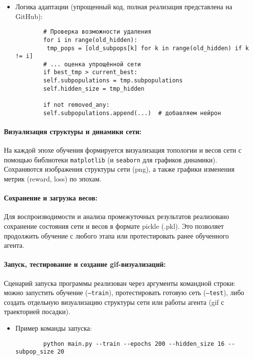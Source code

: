 \documentclass[a4paper,12pt]{article}
\begin{document}
\begin{itemize}
	\item[] Логика адаптации (упрощенный код, полная реализация представлена на GitHub):
	\begin{lstlisting}
		# Проверка возможности удаления
		for i in range(old_hidden):
		 tmp_pops = [old_subpops[k] for k in range(old_hidden) if k != i]
		# ... оценка упрощённой сети
		if best_tmp > current_best:
		self.subpopulations = tmp.subpopulations
		self.hidden_size = tmp_hidden
		
		if not removed_any:
		self.subpopulations.append(...)  # добавляем нейрон
	\end{lstlisting}
\end{itemize}

\paragraph{Визуализация структуры и динамики сети:}

На каждой эпохе обучения формируется визуализация топологии и весов сети с помощью библиотеки \texttt{matplotlib} (и \texttt{seaborn} для графиков динамики). Сохраняются изображения структуры сети (png), а также графики изменения метрик (reward, loss) по эпохам.

\paragraph{Сохранение и загрузка весов:}

Для воспроизводимости и анализа промежуточных результатов реализовано сохранение состояния сети и весов в формате pickle (.pkl). Это позволяет продолжить обучение с любого этапа или протестировать ранее обученного агента.

\paragraph{Запуск, тестирование и создание gif-визуализаций:}

Сценарий запуска программы реализован через аргументы командной строки: можно запустить обучение (\texttt{--train}), протестировать готовую сеть (\texttt{--test}), либо создать отдельную визуализацию структуры сети или работы агента (gif с траекторией посадки).

\begin{itemize}
	\item[] Пример команды запуска:
	\begin{lstlisting}
		python main.py --train --epochs 200 --hidden_size 16 --subpop_size 20
	\end{lstlisting}
\end{itemize}
\end{document}
